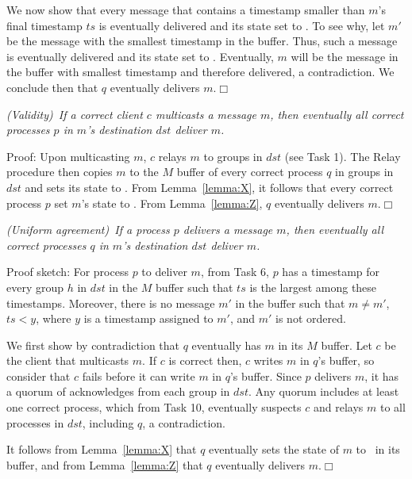 We now show that every message that contains a timestamp smaller than $m$'s final timestamp $ts$ is eventually delivered and its state set to \done.
To see why, let $m'$ be the message with the smallest timestamp in the buffer.
Thus, such a message is eventually delivered and its state set to \ordered.
Eventually, $m$ will be the message in the buffer with smallest timestamp and therefore delivered, a contradiction.
We conclude then that $q$ eventually delivers $m$.\hfill$\Box$


\vspace{2mm}
\setcounter{proposition}{1}
\begin{proposition}
\textit{(Validity)~If a correct client $c$ multicasts a message $m$, then eventually all correct processes $p$ in $m$'s destination $dst$ deliver $m$.}
\end{proposition}
\noindent
{\sc Proof:} 
Upon multicasting $m$, $c$ relays $m$ to groups in $dst$ (see Task 1).
The Relay procedure then copies $m$ to the $M$ buffer of every correct process $q$ in groups in $dst$ and sets its state to \mcast.
From Lemma~\ref{lemma:X}, it follows that every correct process $p$ set $m$'s state to \ordered.
From Lemma~\ref{lemma:Z}, $q$ eventually delivers $m$.\hfill$\Box$

\vspace{2mm}
\begin{proposition}
  \textit{(Uniform agreement)~If a process $p$ delivers a message $m$, then eventually all correct processes $q$ in $m$'s destination $dst$ deliver $m$.}
\end{proposition}
\noindent
{\sc Proof sketch:} 
For process $p$ to deliver $m$, from Task 6, $p$ has a timestamp for every group $h$ in $dst$ in the $M$ buffer such that $ts$ is the largest among these timestamps.
Moreover, there is no message $m'$ in the buffer such that $m \neq m'$, $ts < y$, where $y$ is a timestamp assigned to $m'$, and $m'$ is not ordered.

We first show by contradiction that $q$ eventually has $m$ in its $M$ buffer.
Let $c$ be the client that multicasts $m$.
If $c$ is correct then, $c$ writes $m$ in $q$'s buffer, so consider that $c$ fails before it can write $m$ in $q$'s buffer.
Since $p$ delivers $m$, it has a quorum of acknowledges from each group in $dst$.
Any quorum includes at least one correct process, which from Task 10, eventually suspects $c$ and relays $m$ to all processes in $dst$, including $q$, a contradiction.

It follows from Lemma~\ref{lemma:X} that $q$ eventually sets the state of $m$ to \ordered\ in its buffer, and 
from Lemma~\ref{lemma:Z} that $q$ eventually delivers $m$.\hfill$\Box$

